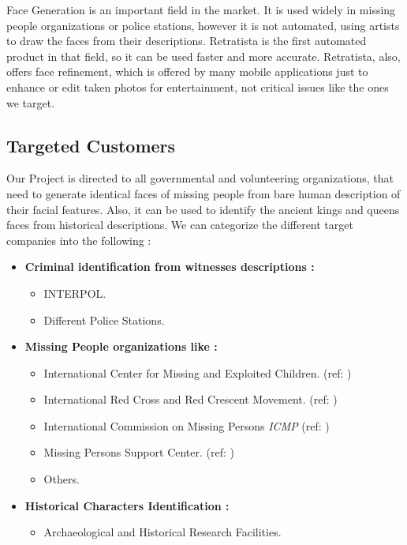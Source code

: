 Face Generation is an important field in the market. It is used widely in missing people organizations or police stations, however it is not automated, using artists to draw the faces from their descriptions. Retratista is the first automated product in that field, so it can be used faster and more accurate. Retratista, also, offers face refinement, which is offered by many mobile applications just to enhance or edit taken photos for entertainment, not critical issues like the ones we target. 

\subsection{Targeted Customers}
Our Project is directed to all governmental and volunteering organizations, that need to generate identical faces of missing people from bare human description of their facial features.
Also, it can be used to identify the ancient kings and queens faces from historical descriptions.
We can categorize the different target companies into the following :
\begin{itemize}
    \item \textbf{Criminal identification from witnesses descriptions :}
        \begin{itemize}
            \item INTERPOL.
            \item Different Police Stations.
        \end{itemize}
    \item \textbf{Missing People organizations like :}
        \begin{itemize}
            \item International Center for Missing and Exploited Children. (ref: )
            \item International Red Cross and Red Crescent Movement. (ref: )
            \item International Commission on Missing Persons \emph{ICMP} (ref: )
            \item Missing Persons Support Center. (ref: )
            \item Others.
        \end{itemize}
    \item \textbf{Historical Characters Identification :}
        \begin{itemize}
            \item Archaeological and Historical Research Facilities.
        \end{itemize}
\end{itemize}

